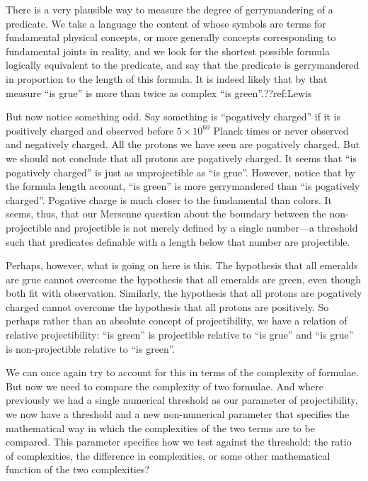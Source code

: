 There is a very plausible way to measure the degree of gerrymandering of a predicate. We take a language the content of 
whose symbols are terms for fundamental physical concepts, or more generally concepts corresponding to fundamental joints in reality, 
and we look for the shortest possible formula logically equivalent to the predicate, and say that the predicate is 
gerrymandered in proportion to the length of this formula. It is indeed likely that by that measure ``is grue'' is more 
than twice as complex ``is green''.??ref:Lewis

But now notice something odd. Say something is ``pogatively charged'' if it is positively charged and observed before
$5\times 10^{60}$ Planck times or never observed and negatively charged. All the protons we have seen are pogatively charged.
But we should not conclude that all protons are pogatively charged. It seems that ``is pogatively charged'' is just as
unprojectible as ``is grue''. However, notice that by the formula length account, ``is green'' is more gerrymandered than ``is 
pogatively charged''. Pogative charge is much closer to the fundamental than colors. It seems, thus, that our Mersenne question
about the boundary between the non-projectible and projectible is not merely defined by a single number---a threshold such that
predicates definable with a length below that number are projectible. 

Perhaps, however, what is going on here is this. The hypothesis that all emeralds are grue cannot overcome the hypothesis that 
all emeralds are green, even though both fit with observation. Similarly, the hypothesis that all protons are pogatively charged 
cannot overcome the hypothesis that all protons are positively. So perhaps rather than an absolute concept of projectibility, we
have a relation of relative projectibility: ``is green'' is projectible relative to ``is grue'' and ``is grue'' is 
non-projectible relative to ``is green''. 

We can once again try to account for this in terms of the complexity of formulae. But now we need to compare the complexity of
two formulae. And where previously we had a single numerical threshold as our parameter of projectibility, we now have a threshold
and a new non-numerical parameter that specifies the mathematical way in which the complexities of the two terms are to be compared. 
This parameter specifies how we test against the threshold: the ratio of complexities, the difference in complexities, or some other
mathematical function of the two complexities?

